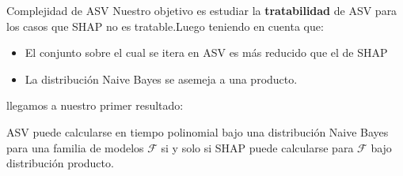 \begin{frame}{Complejidad de ASV}
	Nuestro objetivo es estudiar la \textbf{tratabilidad} de ASV para los casos que SHAP no es tratable.Luego teniendo en cuenta que: \pause 
	
	\begin{itemize}[<+- | alert@+>]
		\item El conjunto sobre el cual se itera en ASV es más reducido que el de SHAP
		\item La distribución Naive Bayes se asemeja a una producto.
	\end{itemize}
	
	\pause
	llegamos a nuestro primer resultado: 
	\begin{mytheorem}
		\small
		ASV puede calcularse en tiempo polinomial bajo una distribución Naive Bayes para una familia de modelos $\mathcal{F}$ si y solo si SHAP puede calcularse para $\mathcal{F}$ bajo distribución producto.
	\end{mytheorem}
\end{frame}

